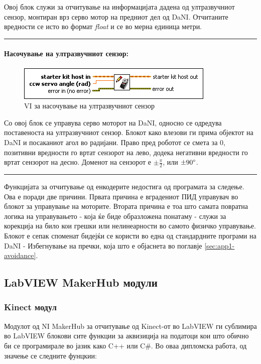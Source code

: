 \documentclass[12pt]{article}
\begin{document}
        Овој блок служи за отчитување на информацијата дадена од ултразвучниот сензор, монтиран врз серво мотор на предниот дел од DaNI. Отчитаните вредности се исто во формат \textit{float} и се во мерна единица метри.
        \textcolor[RGB]{150,150,150}{\rule{\linewidth}{1.6pt}}

    \paragraph{Насочување на ултразвучниот сензор:\\}
    	\begin{figure}[H]
				\includegraphics[width=0.55\linewidth]{./images/write_servo.png}
				\caption{VI за насочување на ултразвучниот сензор}
				\label{fig:write_servo.png}
				\raggedright
				\end{figure}

      Со овој блок се управува серво моторот на DaNI, односно се одредува поставеноста на ултразвучниот сензор. Блокот како влезови ги прима објектот на DaNI и посаканиот агол во радијани. Право пред роботот се смета за 0, позитивни вредности го вртат сензорот на лево, додека негативни вредности го вртат сензорот на десно. Доменот на сензорот е $ \pm \frac{\pi}{2}$, или $\pm 90 \degree$.
      \textcolor[RGB]{150,150,150}{\rule{\linewidth}{1.6pt}}

    Функцијата за отчитување од енкодерите недостига од програмата за следење. Ова е поради две причини. Првата причина е вградениот ПИД управувач во блокот за управување на моторите. Втората причина е тоа што самата повратна логика на управувањето - која ќе биде образложена понатаму - служи за корекција на било кои грешки или нелинеарности во самото физичко управување. Блокот е сепак споменат бидејќи се користи во една од стандардните програми на DaNI - Избегнување на пречки, која што е објаснета во поглавје \ref{sec:app1-avoidance}.

  \subsection{LabVIEW MakerHub модули}
    \subsubsection{Kinect модул}
      Модулот од NI MakerHub за отчитување од Kinect-от во LabVIEW ги сублимира во LabVIEW блокови сите функции за аквизиција на податоци кои што обично би се програмирале во јазик како C++ или C\#. Во оваа дипломска работа, од значење се следните фунцкии:
\end{document}
